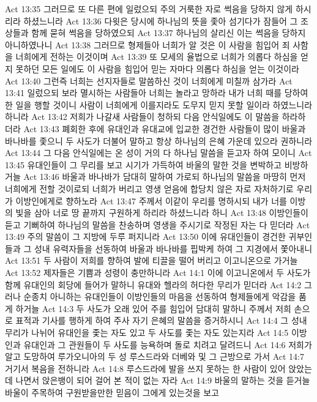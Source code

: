 Act 13:35  그러므로 또 다른 편에 일렀으되 주의 거룩한 자로 썩음을 당하지 않게 하시리라 하셨느니라
Act 13:36  다윗은 당시에 하나님의 뜻을 좇아 섬기다가 잠들어 그 조상들과 함께 묻혀 썩음을 당하였으되
Act 13:37  하나님의 살리신 이는 썩음을 당하지 아니하였나니
Act 13:38  그러므로 형제들아 너희가 알 것은 이 사람을 힘입어 죄 사함을 너희에게 전하는 이것이며
Act 13:39  또 모세의 율법으로 너희가 의롭다 하심을 얻지 못하던 모든 일에도 이 사람을 힘입어 믿는 자마다 의롭다 하심을 얻는 이것이라
Act 13:40  그런즉 너희는 선지자들로 말씀하신 것이 너희에게 미칠까 삼가라
Act 13:41  일렀으되 보라 멸시하는 사람들아 너희는 놀라고 망하라 내가 너희 때를 당하여 한 일을 행할 것이니 사람이 너희에게 이를지라도 도무지 믿지 못할 일이라 하였느니라 하니라
Act 13:42  저희가 나갈새 사람들이 청하되 다음 안식일에도 이 말씀을 하라하더라
Act 13:43  폐회한 후에 유대인과 유대교에 입교한 경건한 사람들이 많이 바울과 바나바를 좇으니 두 사도가 더불어 말하고 항상 하나님의 은혜 가운데 있으라 권하니라
Act 13:44  그 다음 안식일에는 온 성이 거의 다 하나님 말씀을 듣고자 하여 모이니
Act 13:45  유대인들이 그 무리를 보고 시기가 가득하여 바울의 말한 것을 변박하고 비방하거늘
Act 13:46  바울과 바나바가 담대히 말하여 가로되 하나님의 말씀을 마땅히 먼저 너희에게 전할 것이로되 너희가 버리고 영생 얻음에 합당치 않은 자로 자처하기로 우리가 이방인에게로 향하노라
Act 13:47  주께서 이같이 우리를 명하시되 내가 너를 이방의 빛을 삼아 너로 땅 끝까지 구원하게 하리라 하셨느니라 하니
Act 13:48  이방인들이 듣고 기뻐하여 하나님의 말씀을 찬송하며 영생을 주시기로 작정된 자는 다 믿더라
Act 13:49  주의 말씀이 그 지방에 두루 퍼지니라
Act 13:50  이에 유대인들이 경건한 귀부인들과 그 성내 유력자들을 선동하여 바울과 바나바를 핍박케 하여 그 지경에서 쫓아내니
Act 13:51  두 사람이 저희를 향하여 발에 티끌을 떨어 버리고 이고니온으로 가거늘
Act 13:52  제자들은 기쁨과 성령이 충만하니라
Act 14:1  이에 이고니온에서 두 사도가 함께 유대인의 회당에 들어가 말하니 유대와 헬라의 허다한 무리가 믿더라
Act 14:2  그러나 순종치 아니하는 유대인들이 이방인들의 마음을 선동하여 형제들에게 악감을 품게 하거늘
Act 14:3  두 사도가 오래 있어 주를 힘입어 담대히 말하니 주께서 저희 손으로 표적과 기사를 행하게 하여 주사 자기 은혜의 말씀을 증거하시니
Act 14:4  그 성내 무리가 나뉘어 유대인을 좇는 자도 있고 두 사도를 좇는 자도 있는지라
Act 14:5  이방인과 유대인과 그 관원들이 두 사도를 능욕하며 돌로 치려고 달려드니
Act 14:6  저희가 알고 도망하여 루가오니아의 두 성 루스드라와 더베와 및 그 근방으로 가서
Act 14:7  거기서 복음을 전하니라
Act 14:8  루스드라에 발을 쓰지 못하는 한 사람이 있어 앉았는데 나면서 앉은뱅이 되어 걸어 본 적이 없는 자라
Act 14:9  바울의 말하는 것을 듣거늘 바울이 주목하여 구원받을만한 믿음이 그에게 있는것을 보고
